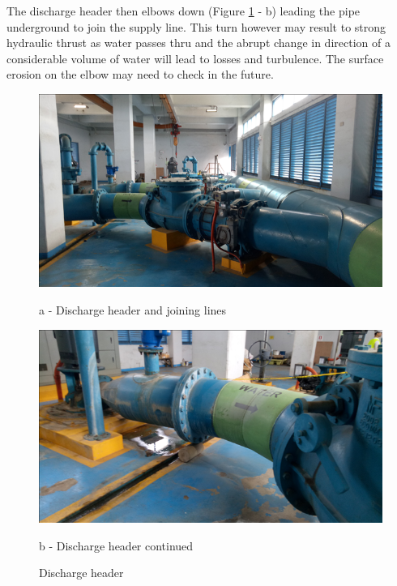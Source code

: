 The discharge header then elbows down (Figure \ref {discharge_piping} - b) leading the pipe underground to join the supply line. This turn however may result to strong hydraulic thrust as water passes thru and the abrupt change in direction of a considerable volume of water will lead to losses and turbulence. The surface erosion on the elbow may need to check in the future. 

\begin{figure} [!htb]
	\begin{minipage}[b]{0.5\linewidth}
		\centering
		\includegraphics[width=\textwidth]{figures/fig_ch043_y_junction}
		\caption*{a - Discharge header and joining lines}
	\end{minipage}
	\hspace{0.05cm}
	\begin{minipage}[b]{0.5\linewidth}
		\centering
		\includegraphics[width=\textwidth]{figures/fig_ch043_discharge_run_p2}
		\caption*{b - Discharge header continued}
	\end{minipage}
\caption{Discharge header}
\label{discharge_piping}
\end{figure}

